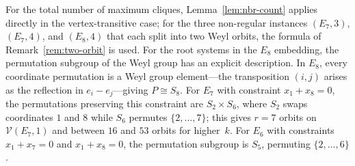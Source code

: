 \documentclass[11pt]{article}
\begin{document}
For the total number of maximum cliques, Lemma~\ref{lem:nbr-count} applies directly in the vertex-transitive case; for the three non-regular instances $(E_7, 3)$, $(E_7, 4)$, and $(E_8, 4)$ that each split into two Weyl orbits, the formula of Remark~\ref{rem:two-orbit} is used. For the root systems in the $E_8$ embedding, the permutation subgroup of the Weyl group has an explicit description. In $E_8$, every coordinate permutation is a Weyl group element---the transposition $(i,j)$ arises as the reflection in $e_i - e_j$---giving $P \cong S_8$. For $E_7$ with constraint $x_1 + x_8 = 0$, the permutations preserving this constraint are $S_2 \times S_6$, where $S_2$ swaps coordinates $1$ and $8$ while $S_6$ permutes $\{2, \ldots, 7\}$; this gives $r = 7$ orbits on $\mathcal{V}(E_7, 1)$ and between $16$ and $53$ orbits for higher~$k$. For $E_6$ with constraints $x_1 + x_7 = 0$ and $x_1 + x_8 = 0$, the permutation subgroup is $S_5$, permuting $\{2, \ldots, 6\}$.
\end{document}
